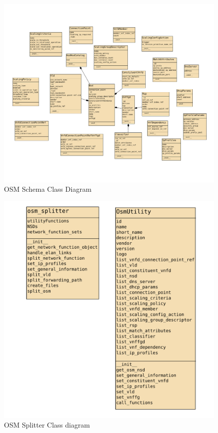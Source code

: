 \begin{figure}
	\centering
	\includegraphics[width=1\linewidth]{figures/osm-schema}
	\caption{OSM Schema Class Diagram}
	\label{fig:osmschemaclassdiagram}
\end{figure}

\begin{figure}
	\centering
	\includegraphics[width=1\linewidth]{figures/OSM-Splitter}
	\caption{OSM Splitter Class diagram}
	\label{fig:osmsplitterclassdiagram}
\end{figure}

